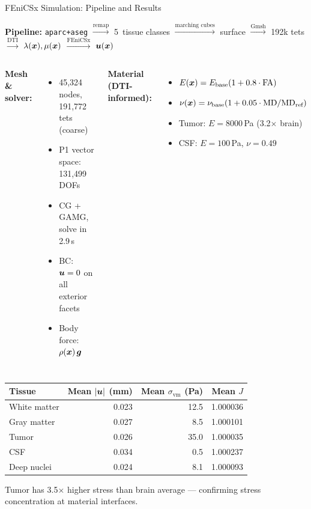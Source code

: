 \begin{frame}{FEniCSx Simulation: Pipeline and Results}

  \small

  \textbf{Pipeline:}\quad
  \texttt{aparc+aseg} $\xrightarrow{\text{remap}}$
  5~tissue classes $\xrightarrow{\text{marching cubes}}$
  surface $\xrightarrow{\text{Gmsh}}$
  192k tets $\xrightarrow{\text{DTI}}$
  $\lambda(\bm{x}), \mu(\bm{x})$ $\xrightarrow{\text{FEniCSx}}$
  $\bm{u}(\bm{x})$

  \medskip

  \begin{columns}[T]
    \textbf{Mesh \& solver:}
    \begin{itemize}\setlength\itemsep{1pt}
      \item 45,324 nodes, 191,772 tets (coarse)
      \item P1 vector space: 131,499 DOFs
      \item CG + GAMG, solve in \alert{2.9\,s}
      \item BC: $\bm{u} = 0$ on all exterior facets
      \item Body force: $\rho(\bm{x}) \, \bm{g}$
    \end{itemize}

    \textbf{Material (DTI-informed):}
    \begin{itemize}\setlength\itemsep{1pt}
      \item $E(\bm{x}) = E_{\text{base}} (1 + 0.8 \cdot \text{FA})$
      \item $\nu(\bm{x}) = \nu_{\text{base}} (1 + 0.05 \cdot \text{MD}/\text{MD}_{\text{ref}})$
      \item Tumor: $E = 8000$\,Pa (3.2$\times$ brain)
      \item CSF: $E = 100$\,Pa, $\nu = 0.49$
    \end{itemize}
  \end{columns}

  \medskip

  \begin{center}
  \begin{tabular}{lrrr}
    \toprule
    \textbf{Tissue} & \textbf{Mean $|\bm{u}|$ (mm)} &
      \textbf{Mean $\sigma_{\text{vm}}$ (Pa)} & \textbf{Mean $J$} \\
    \midrule
    White matter   & 0.023 & 12.5 & 1.000036 \\
    Gray matter    & 0.027 & \phantom{0}8.5 & 1.000101 \\
    \alert{Tumor}  & 0.026 & \alert{35.0} & 1.000035 \\
    CSF            & 0.034 & \phantom{0}0.5 & 1.000237 \\
    Deep nuclei    & 0.024 & \phantom{0}8.1 & 1.000093 \\
    \bottomrule
  \end{tabular}
  \end{center}

  Tumor has 3.5$\times$ higher stress than brain average ---
  confirming stress concentration at material interfaces.

\end{frame}

